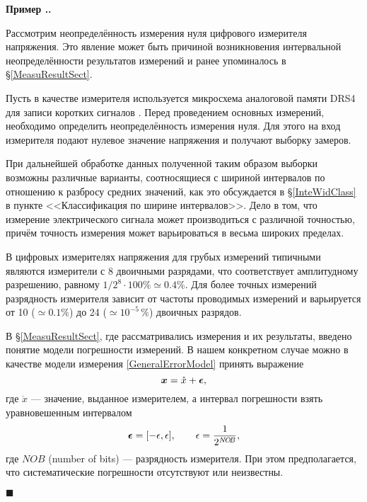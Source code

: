 \documentclass[a5paper,openany]{book}
\newcommand{\mbf}[1]{\protect\text{\boldmath$#1$}}
\newcounter{ExmpNum}[section]
\renewcommand{\theExmpNum}{\thesection.\arabic{ExmpNum}}
\newenvironment{example}%
  {\refstepcounter{ExmpNum}%
  \par\addvspace{\medskipamount} 
  \noindent\textbf{Пример {\theExmpNum}.}
  }%
  {\hfill$\blacksquare$\par\medskip}
\begin{document}
\begin{example} 
\label{ConstExmp} 
Рассмотрим неопределённость измерения нуля цифрового измерителя напряжения. 
Это явление может быть причиной возникновения интервальной неопределённости 
результатов измерений и ранее упоминалось в \S\ref{MeasuResultSect}. 

Пусть в качестве измерителя используется микросхема аналоговой памяти DRS4 для записи 
коротких сигналов \cite{DRS4}. Перед проведением основных измерений, необходимо 
определить неопределённость измерения нуля. Для этого на вход измерителя подают 
нулевое значение напряжения и получают выборку замеров. 

При дальнейшей обработке данных полученной таким образом выборки возможны различные 
варианты, соотносящиеся с шириной интервалов по отношению к разбросу средних значений, 
как это обсуждается в \S\ref{InteWidClass} в пункте <<Классификация по ширине 
интервалов>>. Дело в том, что измерение электрического сигнала может производиться 
с различной точностью, причём точность измерения может варьироваться  в весьма 
широких пределах. 
  
В цифровых измерителях напряжения для грубых измерений типичными являются измерители 
с 8 двоичными разрядами, что соответствует амплитудному разрешению, равному $1/2^8 
\cdot 100\% \simeq 0.4\% $. Для более точных измерений разрядность измерителя 
зависит от частоты проводимых измерений и варьируется от 10 ($\simeq 0.1 \%$) 
до 24 ($\simeq 10^{-5}\,\%$) двоичных разрядов.
  
В \S\ref{MeasuResultSect}, где рассматривались измерения и их результаты, введено 
понятие модели погрешности измерений. В нашем конкретном случае можно в качестве 
модели измерения \eqref{GeneralErrorModel} принять выражение
\begin{equation} 
\mbf{x} = \mathring{x} + \mbf{\epsilon}, 
\end{equation}
где $\mathring{x}$ --- значение, выданное измерителем, а интервал погрешности взять 
уравновешенным интервалом  
\begin{equation}
\label{ErrorNOB}
\mbf{\epsilon} = [-\epsilon, \epsilon], \qquad \epsilon = \frac{1}{2^{\mathit{N\!O\!B}}},
\end{equation}
где $\mathit{N \!O\!B}$ (number of bits) --- разрядность измерителя.
При этом предполагается, что систематические погрешности отсутствуют или неизвестны. 
   

\end{example}
\end{document}
